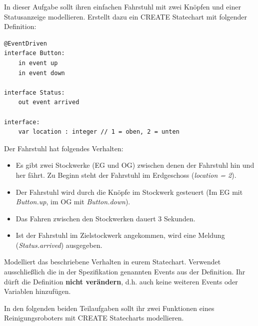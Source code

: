 
In dieser Aufgabe sollt ihren einfachen Fahrstuhl mit zwei Knöpfen und einer Statusanzeige modellieren.
Erstellt dazu ein CREATE Statechart mit folgender Definition:

\begin{lstlisting}
@EventDriven
interface Button:
    in event up
    in event down

interface Status:
    out event arrived

interface:
    var location : integer // 1 = oben, 2 = unten
\end{lstlisting}

Der Fahrstuhl hat folgendes Verhalten:

\begin{itemize}
\item Es gibt zwei Stockwerke (EG und OG) zwischen denen der Fahrstuhl hin und her fährt.
Zu Beginn steht der Fahrstuhl im Erdgeschoss (\textit{location = 2}).

\item Der Fahrstuhl wird durch die Knöpfe im Stockwerk gesteuert
(Im EG mit \textit{Button.up}, im OG mit \textit{Button.down}).

\item Das Fahren zwischen den Stockwerken dauert 3 Sekunden.

\item Ist der Fahrstuhl im Zielstockwerk angekommen, wird eine Meldung
(\textit{Status.arrived}) ausgegeben.
\end{itemize}

Modelliert das beschriebene Verhalten in eurem Statechart. Verwendet ausschließlich die in der
Spezifikation genannten Events aus der Definition. Ihr dürft die Definition \textbf{nicht verändern},
d.h. auch keine weiteren Events oder Variablen hinzufügen.


In den folgenden beiden Teilaufgaben sollt ihr zwei Funktionen eines Reinigungsroboters mit CREATE Statecharts modellieren.

